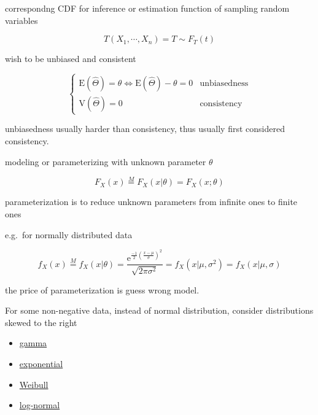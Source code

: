 \documentclass[
]{book}
\providecommand{\tightlist}{%
  \setlength{\itemsep}{0pt}\setlength{\parskip}{0pt}}
\theoremstyle{definition}
\theoremstyle{definition}
\theoremstyle{definition}
\theoremstyle{definition}
\theoremstyle{remark}
\begin{document}
correspondng CDF for inference or estimation function of sampling random variables

\[
T\left(X_{{\scriptscriptstyle 1}},\cdots,X_{{\scriptscriptstyle n}}\right)=T\sim F_{{\scriptscriptstyle T}}\left(t\right)
\]

wish to be unbiased and consistent

\[
\begin{cases}
\mathrm{E}\left(\widehat{\Theta}\right)=\theta\Leftrightarrow\mathrm{E}\left(\widehat{\Theta}\right)-\theta=0 & \text{unbiasedness}\\
\mathrm{V}\left(\widehat{\Theta}\right)=0 & \text{consistency}
\end{cases}
\]

unbiasedness usually harder than consistency, thus usually first considered consistency.

modeling or parameterizing with unknown parameter \(\theta\)

\[
F_{{\scriptscriptstyle X}}\left(x\right)\overset{M}{=}F_{{\scriptscriptstyle X}}\left(x|\theta\right)=F_{{\scriptscriptstyle X}}\left(x;\theta\right)
\]

parameterization is to reduce unknown parameters from infinite ones to finite ones

e.g.~for normally distributed data

\[
f_{{\scriptscriptstyle X}}\left(x\right)\overset{M}{=}f_{{\scriptscriptstyle X}}\left(x|\theta\right)=\dfrac{\mathrm{e}^{{\scriptscriptstyle \frac{-1}{2}\left(\frac{x-\mu}{\sigma}\right)^{2}}}}{\sqrt{2\pi\sigma^{2}}}=f_{{\scriptscriptstyle X}}\left(x|\mu,\sigma^{2}\right)=f_{{\scriptscriptstyle X}}\left(x|\mu,\sigma\right)
\]

the price of parameterization is guess wrong model.

For some non-negative data, instead of normal distribution, consider distributions skewed to the right

\begin{itemize}
\tightlist
\item
  \href{https://en.wikipedia.org/wiki/Gamma_distribution}{gamma}
\item
  \href{https://en.wikipedia.org/wiki/Exponential_distribution}{exponential}
\item
  \href{https://en.wikipedia.org/wiki/Weibull_distribution}{Weibull}
\item
  \href{https://en.wikipedia.org/wiki/Log-normal_distribution}{log-normal}
\end{itemize}
\end{document}
